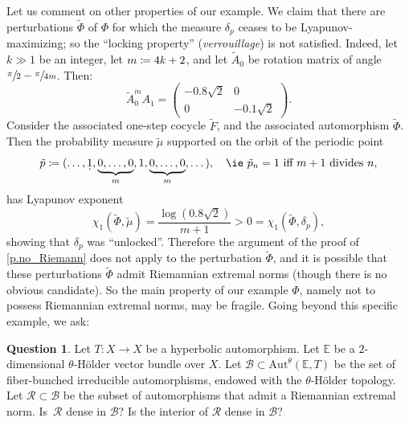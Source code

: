 \documentclass[JEP,XML,SOM,Unicode]{cedram}
\let\mathcal\mathscr
\def\vcentcolon{\mathrel{\mathop\ordinarycolon}}
\providecommand\ordinarycolon{:}
\providecommand*\coloneqq{\vcentcolon\mathrel{\mkern-1.2mu}=}
\newcommand{\underdot}[1]{\smash{\underset{\raisebox{3pt}{.}}{#1}}}
\theoremstyle{plain}
\theoremstyle{definition}
\newtheorem{question}[theorem]{Question}
\newcommand{\EE}{\mathbb{E}}
\newcommand{\cB}{\mathcal{B}}
\newcommand{\cR}{\mathcal{R}}
\newcommand{\Aut}{\mathrm{Aut}}
\begin{document}
\vspace*{-3pt}
Let us comment on other properties of our example.
We claim that there are perturbations $\tilde \Phi$ of $\Phi$ for which the measure $\delta_p$ ceases to be Lyapunov-maximizing; so the ``locking property'' (\emph{verrouillage}) is not satisfied.
Indeed, let $k \gg 1$ be an integer, let $m \coloneqq 4k+2$, and let $\tilde A_0$ be rotation matrix of angle $\sfrac{\pi}{2} - \sfrac{\pi}{4m}$.
Then:
\[
\tilde{A}_0^{m} A_1 = \begin{pmatrix} -0.8 \sqrt{2} & 0 \\ 0 & -0.1 \sqrt{2}\end{pmatrix}.
\]
Consider the associated one-step cocycle $\tilde F$, and the associated automorphism $\tilde \Phi$.
Then the probability measure $\tilde \mu$ supported on the orbit of the periodic point
\[
\tilde p \coloneqq
(\dots, \underdot{1}, \underbrace{0, \dots, 0}_m, 1, \underbrace{0, \dots, 0}_m, \dots), \quad \text{\ie $\tilde p_n = 1$ iff $m+1$ divides $n$,}
\]
has Lyapunov exponent
\[
\chi_1(\tilde\Phi, \tilde \mu) = \frac{\log(0.8 \sqrt{2})}{m+1} > 0 = \chi_1(\tilde\Phi, \delta_p),
\]
showing that $\delta_p$ was ``unlocked''.
Therefore the argument of the proof of \cref{p.no_Riemann} does not apply to the perturbation $\tilde\Phi$, and it is possible that these perturbations $\tilde \Phi$ admit Riemannian extremal norms (though there is no obvious candidate).
So the main property of our example $\Phi$, namely not to possess Riemannian extremal norms, may be fragile.
Going beyond this specific example, we ask:

\begin{question}
Let $T \colon X \to X$ be a hyperbolic automorphism.
Let $\EE$ be a $2$\nobreakdash-dimensional $\theta$-Hölder vector bundle over $X$.
Let $\cB \subset \Aut^\theta(\EE,T)$ be the set of fiber-bunched irreducible automorphisms, endowed with the $\theta$-Hölder topology.
Let $\cR \subset \cB$ be the subset of automorphisms that admit a Riemannian extremal norm.
Is~$\cR$ dense in $\cB$?
Is the interior of $\cR$ dense in $\cB$?
\end{question}




\end{document}

